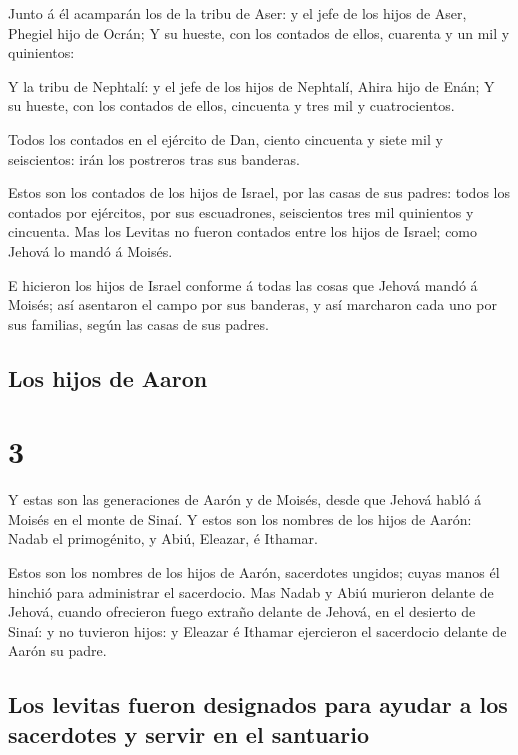  Junto á él acamparán los de la tribu de Aser: y el jefe
de los hijos de Aser, Phegiel hijo de Ocrán;  Y su
hueste, con los contados de ellos, cuarenta y un mil y quinientos:

 Y la tribu de Nephtalí: y el jefe de los hijos de
Nephtalí, Ahira hijo de Enán;  Y su hueste, con los
contados de ellos, cincuenta y tres mil y cuatrocientos.

 Todos los contados en el ejército de Dan, ciento
cincuenta y siete mil y seiscientos: irán los postreros tras sus
banderas.

 Estos son los contados de los hijos de Israel, por las
casas de sus padres: todos los contados por ejércitos, por sus
escuadrones, seiscientos tres mil quinientos y cincuenta.
 Mas los Levitas no fueron contados entre los hijos de
Israel; como Jehová lo mandó á Moisés.

 E hicieron los hijos de Israel conforme á todas las
cosas que Jehová mandó á Moisés; así asentaron el campo por sus
banderas, y así marcharon cada uno por sus familias, según las casas de
sus padres.

\hypertarget{los-hijos-de-aaron}{%
\subsection{Los hijos de Aaron}\label{los-hijos-de-aaron}}

\hypertarget{section-04-3}{%
\section{3}\label{section-04-3}}

 Y estas son las generaciones de Aarón y de Moisés, desde
que Jehová habló á Moisés en el monte de Sinaí.  Y estos
son los nombres de los hijos de Aarón: Nadab el primogénito, y Abiú,
Eleazar, é Ithamar.

 Estos son los nombres de los hijos de Aarón, sacerdotes
ungidos; cuyas manos él hinchió para administrar el sacerdocio.
 Mas Nadab y Abiú murieron delante de Jehová, cuando
ofrecieron fuego extraño delante de Jehová, en el desierto de Sinaí: y
no tuvieron hijos: y Eleazar é Ithamar ejercieron el sacerdocio delante
de Aarón su padre.

\hypertarget{los-levitas-fueron-designados-para-ayudar-a-los-sacerdotes-y-servir-en-el-santuario}{%
\subsection{Los levitas fueron designados para ayudar a los sacerdotes y
servir en el
santuario}\label{los-levitas-fueron-designados-para-ayudar-a-los-sacerdotes-y-servir-en-el-santuario}}

